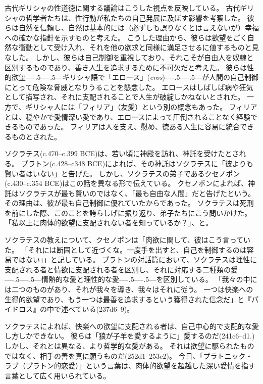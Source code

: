 \documentclass[paper=a4,book,openany]{jlreq}
\def\DDASH{―\kern-.5\zw―\kern-.5\zw―} %
\begin{document}
古代ギリシャの性道徳に関する議論はこうした視点を反映している。
古代ギリシャの哲学者たちは、性行動が私たちの自己発展に及ぼす影響を考察した。
彼らは自然を信頼し、自然は基本的には（必ずしも誤りなくとは言えないが）幸福への確かな指針を示すものと考えた。
こうした理由から、彼らは欲望をごく自然な衝動として受け入れ、それを他の欲求と同様に満足させるに値するものと見なした。
しかし、彼らは自己制御を重視しており、それこそが自由人を奴隷と区別するものであり、善き人生を追求するために不可欠だと考えた。
彼らは性的欲望{\DDASH}ギリシャ語で「エロース」(\emph{eros}){\DDASH}が人間の自己制御にとって危険な脅威となりうることを懸念した。
エロースはしばしば病や狂気として描写され、それに支配されることで人生が破綻しかねないとされた。
一方で、ギリシャ人には「フィリア」（友愛）という別の概念もあった。
フィリアとは、穏やかで愛情深い愛であり、エロースによって圧倒されることなく経験できるものであった。
フィリアは人を支え、慰め、徳ある人生に容易に統合できるものとされた。

ソクラテス(c.470--c.399 BCE)は、若い頃に神殿を訪れ、神託を受けたとされる。
プラトン(c.428--c348 BCE)によれば、その神託はソクラテスに「彼よりも賢い者はいない」と告げた。
しかし、ソクラテスの弟子であるクセノポン(c.430--c.354 BCE)はこの話を異なる形で伝えている。
クセノポンによれば、神託はソクラテスが最も賢いのではなく、「最も自由な人間」だと告げたという。
その理由は、彼が最も自己制御に優れていたからであった。
ソクラテスは死刑を前にした際、このことを誇らしげに振り返り、弟子たちにこう問いかけた。
「私以上に肉体的欲望に支配されない者を知っているか？」、と\citep[16]{xenophon13:_apolog_socrat}。

ソクラテスの教えについて、クセノポンは「肉欲に関して、彼はこう言っていた。
「それには断固として近づくな。一度手を出すと、自己を制御するのは容易ではない」」\citep{xenophon13:_memor}と記している。
プラトンの対話篇において、ソクラテスは理性に支配される者と情欲に支配される者を区別し、それに対応する二種類の愛{\DDASH}情熱的な愛と理性的な愛{\DDASH}を区別している。
「我々の中には二つのものがあり、それが我々を導き、我々はそれに従う。
一つは快楽への生得的欲望であり、もう一つは最善を追求するという獲得された信念だ」と『パイドロス』の中で述べている(237d6--9)。

ソクラテスによれば、快楽への欲望に支配される者は、自己中心的で支配的な愛し方しかできない。
彼らは「狼が子羊を愛するように」愛するのだ(241c6--d1.)%
しかし、それとは異なる、より哲学的な愛がある。
それは欲望に駆られたものではなく、相手の善を真に願うものだ(252d1--253c2)。
今日、「プラトニック・ラブ（プラトン的恋愛）」という言葉は、肉体的欲望を超越した深い愛情を指す言葉として広く用いられている。
\end{document}
